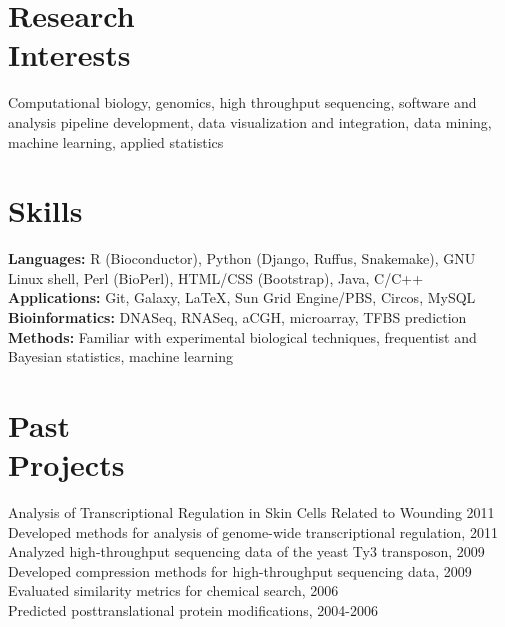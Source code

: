 \documentclass[margin,line]{res}
\begin{document}
\begin{resume}
\section{\sc Research\\Interests}
Computational biology, genomics, high throughput sequencing, software and analysis pipeline development, data visualization and integration, data mining, machine learning, applied statistics

\section{\sc Skills} 
\textbf{Languages:} R (Bioconductor), Python (Django, Ruffus, Snakemake), GNU Linux shell, Perl (BioPerl), HTML/CSS (Bootstrap), Java, C/C++\\
\textbf{Applications:} Git, Galaxy, \LaTeX, Sun Grid Engine/PBS, Circos, MySQL\\
\textbf{Bioinformatics:} DNASeq, RNASeq, aCGH, microarray, TFBS prediction\\
\textbf{Methods:} Familiar with experimental biological techniques, frequentist and Bayesian statistics, machine learning


\section{\sc Past\\Projects}
Analysis of Transcriptional Regulation in Skin Cells Related to Wounding 2011
Developed methods for analysis of genome-wide transcriptional regulation, 2011 \\
Analyzed high-throughput sequencing data of the yeast Ty3 transposon, 2009\\
Developed compression methods for high-throughput sequencing data, 2009 \\
Evaluated similarity metrics for chemical search, 2006\\
Predicted posttranslational protein modifications, 2004-2006


\end{resume}
\end{document}

